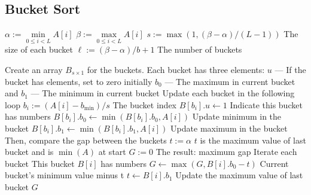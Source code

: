 \subsection{Bucket Sort}
\begin{algorithm}[H]
\begin{algorithmic}[1]
\State {}
\EndIf
\State $\alpha:=\min\limits_{0\leq i <L}A[i]$
\State $\beta:=\max\limits_{0\leq i <L}A[i]$
\State $s:=\max(1, (\beta-\alpha)/(L-1))$ \Comment The size of each bucket
\State $\ell:=(\beta-\alpha) / b +1$ \Comment The number of buckets
\end{algorithmic}
\end{algorithm}
\begin{algorithm}[H]
\begin{algorithmic}[1]
\State Create an array $B_{s\times 1}$ for the buckets.
\State Each bucket has three elements: 
\State $u$ --- If the bucket has elements, set to zero initially 
\State $b_0$ --- The maximum in current bucket and 
\State $b_1$ --- The minimum in current bucket
\State Update each bucket in the following loop
\State $b_i:=(A[i]-b_{\min})/s$ \Comment The bucket index
\State $B[b_i].u\gets 1$ \Comment Indicate this bucket has numbers
\State $B[b_i].b_0\gets \min(B[b_i].b_0, A[i])$ \Comment Update minimum in the bucket
\State $B[b_i].b_1\gets \min(B[b_i].b_1, A[i])$ \Comment Update maximum in the bucket
\EndFor
\State Then, compare the gap between the buckets
\State $t:=\alpha$ \Comment $t$ is the maximum value of last bucket and is $\min(A)$ at start
\State $G:=0$ \Comment The result: maximum gap
 \Comment Iterate each bucket
 \Comment This bucket $B[i]$ has numbers
\State $G\gets \max(G, B[i].b_0 - t)$ \Comment Current bucket's minimum value minus t
\State $t\gets B[i].b_1$ \Comment Update the maximum value of last bucket
\EndIf
\EndFor
\State \Return $G$
\EndProcedure
\end{algorithmic}
\end{algorithm}